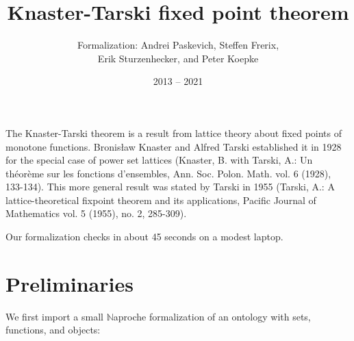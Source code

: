 \documentclass{article}
\title{Knaster-Tarski fixed point theorem}
\author{\Naproche{} Formalization: Andrei Paskevich, Steffen Frerix,\\ Erik Sturzenhecker, and Peter Koepke}
\date{2013 -- 2021}
\begin{document}

  \maketitle

  The Knaster-Tarski theorem is a result from lattice theory about fixed points of monotone functions.
  Bronis\l aw Knaster and Alfred Tarski established it in 1928 for the special case of power set lattices
  (Knaster, B. with Tarski, A.: Un th\' eor\`eme sur les fonctions d'ensembles, Ann. Soc. Polon. Math.
  vol. 6 (1928), 133-134). This more general result was stated by Tarski in 1955 (Tarski, A.: A lattice-theoretical
  fixpoint theorem and its applications, Pacific Journal of Mathematics vol. 5 (1955), no. 2, 285-309).

Our formalization checks in about 45 seconds on a modest laptop.

  \section{Preliminaries}
We first import a small $\mathbb{N}$aproche formalization of an ontology with sets,
functions, and objects:
  \begin{forthel}
  \end{forthel}
\end{document}

